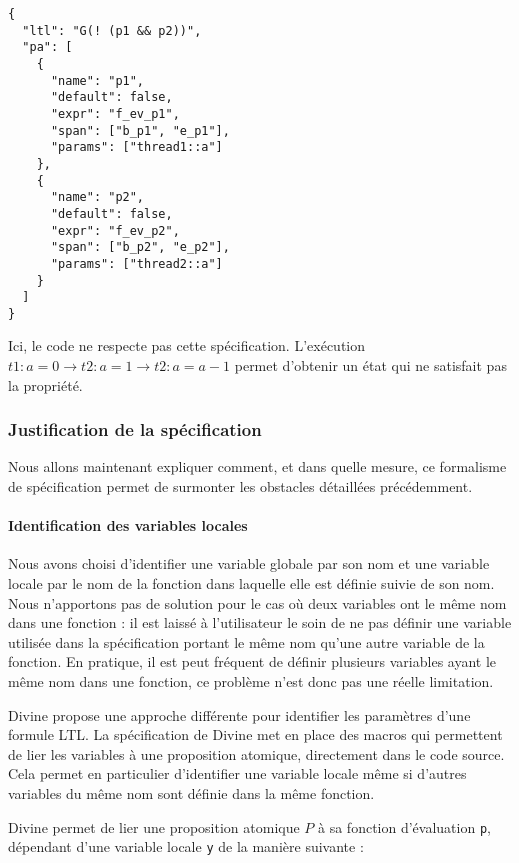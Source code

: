 \begin{lstlisting}
{
  "ltl": "G(! (p1 && p2))",
  "pa": [
    {
      "name": "p1",
      "default": false,
      "expr": "f_ev_p1",
      "span": ["b_p1", "e_p1"],
      "params": ["thread1::a"]
    },
    {
      "name": "p2",
      "default": false,
      "expr": "f_ev_p2",
      "span": ["b_p2", "e_p2"],
      "params": ["thread2::a"]
    }
  ]
}
\end{lstlisting}

Ici, le code ne respecte pas cette spécification. L'exécution
\(t1: a = 0 \rightarrow t2: a = 1 \rightarrow t2: a = a - 1\) permet
d'obtenir un état qui ne satisfait pas la propriété.

\subsubsection{Justification de la spécification}

Nous allons maintenant expliquer comment, et dans quelle mesure, ce formalisme
de spécification permet de surmonter les obstacles détaillées précédemment.

\paragraph{Identification des variables locales}

Nous avons choisi d'identifier une variable globale par son nom et une
variable locale par le nom de la fonction dans laquelle elle est définie
suivie de son nom. Nous n'apportons pas de solution pour le cas où deux
variables ont le même nom dans une fonction : il est laissé à
l'utilisateur le soin de ne pas définir une variable utilisée dans la
spécification portant le même nom qu'une autre variable de la fonction.
En pratique, il est peut fréquent de définir plusieurs variables ayant le
même nom dans une fonction, ce problème n'est donc pas une réelle
limitation.

Divine \cite{Divine_LTL} propose une approche différente pour
identifier les paramètres d'une formule LTL. La spécification de Divine
met en place des macros qui permettent de lier les variables à une
proposition atomique, directement dans le code source. Cela permet en
particulier d'identifier une variable locale même si d'autres variables
du même nom sont définie dans la même fonction.

Divine permet de lier une proposition atomique \(P\) à sa fonction
d'évaluation \lstinline!p!, dépendant d'une variable locale
\lstinline!y! de la manière suivante :

